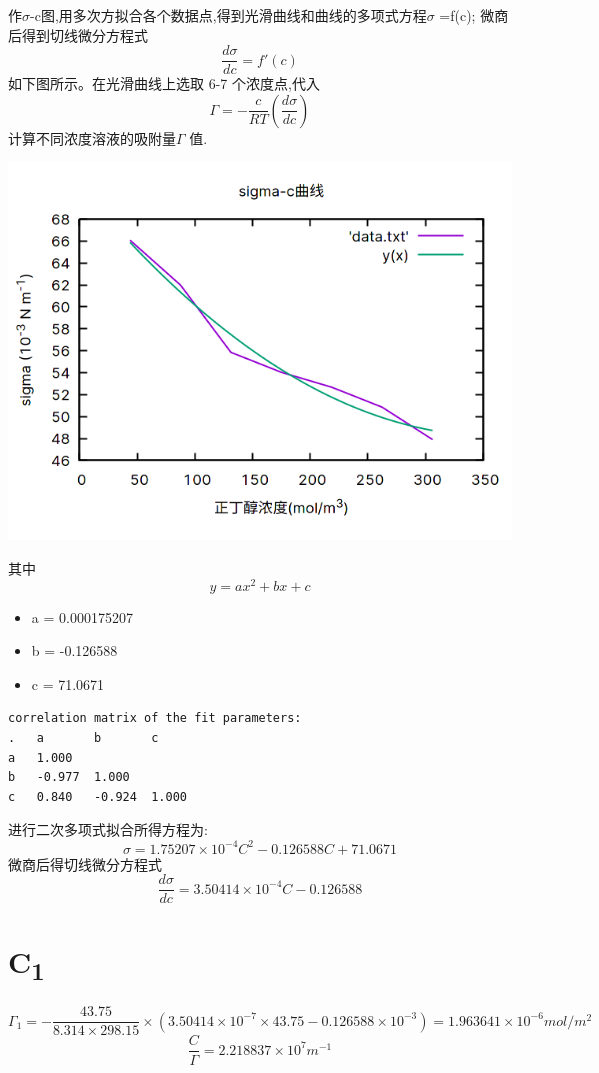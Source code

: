 \documentclass[11pt]{report}
\begin{document}
作\(\sigma\)-c图,用多次方拟合各个数据点,得到光滑曲线和曲线的多项式方程\(\sigma\) =f(c);
微商后得到切线微分方程式
\[
   \frac{d\sigma}{dc}=f'(c)
   \]
如下图所示。在光滑曲线上选取 6-7 个浓度点,代入
\[
   \Gamma=-\frac{c}{RT}\left(\frac{d\sigma}{dc}\right)
   \]
计算不同浓度溶液的吸附量\(\Gamma\) 值.

\begin{center}
\includegraphics[width=.9\linewidth]{../img/sigma-1.png}
\end{center}
其中
\[
   y=ax^{2}+bx+c
   \]
\begin{itemize}
\item a = 0.000175207
\item b = -0.126588
\item c = 71.0671
\end{itemize}

\begin{verbatim}
correlation matrix of the fit parameters:
.	a      	b      	c      
a	1.000 
b	-0.977  1.000 
c	0.840 	-0.924	1.000 
\end{verbatim}

进行二次多项式拟合所得方程为:
\[
	\sigma=1.75207\times 10^{-4}C^{2}-0.126588C+71.0671
	\]
微商后得切线微分方程式
\[
	\frac{d\sigma}{dc}=3.50414\times 10^{-4}C-0.126588
	\]
\section{C\textsubscript{1}}
\label{sec:org8ef1cb9}
\[
    \Gamma_{1}=-\frac{43.75}{8.314\times 298.15}\times (3.50414\times 10^{-7}\times 43.75-0.126588\times 10^{-3})=1.963641\times 10^{-6} mol/m^{2}
    \]
\[
    \frac{C}{\Gamma}=2.218837\times 10^{7}m^{-1}
    \]
\end{document}
